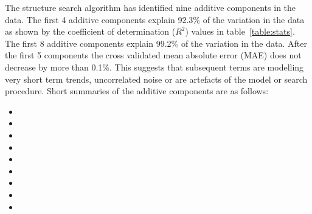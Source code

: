 \documentclass{article} %
\begin{document}
The structure search algorithm has identified nine additive components in the data.
The  first 4 additive components explain 92.3\% of the variation in the data as shown by the coefficient of determination ($R^2$) values in table~\ref{table:stats}.
The  first 8 additive components explain 99.2\% of the variation in the data.
After the first 5 components the cross validated mean absolute error (MAE) does not decrease by more than 0.1\%.
This suggests that subsequent terms are modelling very short term trends, uncorrelated noise or are artefacts of the model or search procedure.
Short summaries of the additive components are as follows:
\begin{itemize}

  \item  

  \item  

  \item  

  \item  

  \item  

  \item  

  \item  

  \item  

  \item  

\end{itemize}
\end{document}
